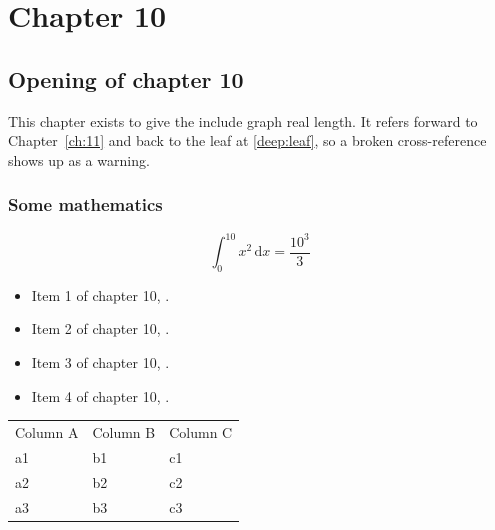\chapter{Chapter 10}
\label{ch:10}
\section{Opening of chapter 10}
This chapter exists to give the include graph real length. It refers
forward to Chapter~\ref{ch:11} and back to the leaf
at \ref{deep:leaf}, so a broken cross-reference shows up as a warning.

\subsection{Some mathematics}
\begin{equation}
  \int_0^{10} x^{2} \, \mathrm{d}x = \frac{10^{3}}{3}
\end{equation}

\begin{itemize}
  \item Item 1 of chapter 10, .
  \item Item 2 of chapter 10, .
  \item Item 3 of chapter 10, .
  \item Item 4 of chapter 10, .
\end{itemize}

\begin{tabular}{lll}
  Column A & Column B & Column C \\
  a1 & b1 & c1 \\
  a2 & b2 & c2 \\
  a3 & b3 & c3 \\
\end{tabular}
